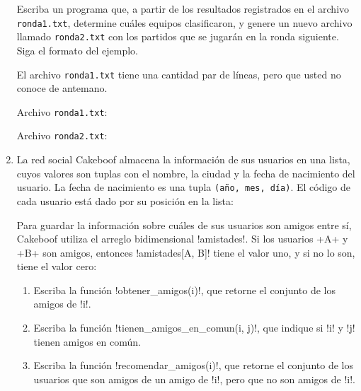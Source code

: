 \documentclass[11pt,spanish]{article}
\newcommand{\pond}[1]{[{\small\textbf{#1\%}}]}
\begin{document}
\begin{enumerate}[font=\Large\bfseries]
      Escriba un programa que,
      a partir de los resultados registrados en el archivo \texttt{ronda1.txt},
      determine cuáles equipos clasificaron,
      y genere un nuevo archivo llamado \texttt{ronda2.txt}
      con los partidos que se jugarán en la ronda siguiente.
      Siga el formato del ejemplo.

      El archivo \texttt{ronda1.txt} tiene una cantidad par de líneas,
      pero que usted no conoce de antemano.

      \begin{minipage}[t]{.28\textwidth}
        Archivo \texttt{ronda1.txt}:
        
      \end{minipage}
      \hspace{3em}
      \begin{minipage}[t]{.28\textwidth}
        Archivo \texttt{ronda2.txt}:
        
      \end{minipage}

    \newpage
    \item
      \pond{33\(\frac{1}{3}\)\!}
      La red social Cakeboof almacena la información de sus usuarios en una lista,
      cuyos valores son tuplas con el nombre, la ciudad y la fecha de nacimiento del usuario.
      La fecha de nacimiento es una tupla \texttt{(año, mes, día)}.
      El código de cada usuario está dado por su posición en la lista:
      

      Para guardar la información sobre cuáles de sus usuarios son amigos entre sí,
      Cakeboof utiliza el arreglo bidimensional \li!amistades!.
      Si los usuarios \li+A+ y \li+B+ son amigos,
      entonces \li!amistades[A, B]! tiene el valor uno,
      y si no lo son, tiene el valor cero:
      

      \begin{enumerate}
        \item Escriba la función \li!obtener_amigos(i)!,
          que retorne el conjunto de los amigos de \li!i!.
        \item Escriba la función \li!tienen_amigos_en_comun(i, j)!,
          que indique si \li!i! y \li!j! tienen amigos en común.
        \item Escriba la función \li!recomendar_amigos(i)!,
          que retorne el conjunto de los usuarios
          que son amigos de un amigo de \li!i!,
          pero que no son amigos de \li!i!.
      \end{enumerate}
      

  \end{enumerate}
\end{document}
